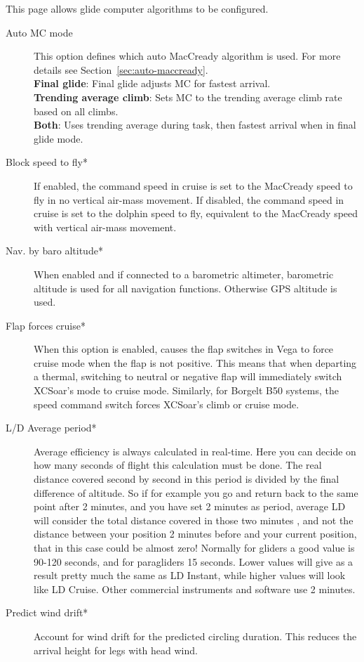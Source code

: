 This page allows glide computer algorithms to be configured.

\begin{description}
\item[Auto MC mode]  This option defines which auto MacCready algorithm is used.
  For more details see Section~\ref{sec:auto-maccready}. \\
  {\bf Final glide}: Final glide adjusts MC for fastest arrival. \\
  {\bf Trending average climb}: Sets MC to the trending average climb rate based 
  on all climbs. \\
  {\bf Both}: Uses trending average during task, then fastest arrival when in final 
  glide mode.
\item[Block speed to fly*]  If enabled, the command speed in cruise
  is set to the MacCready speed to fly in no vertical air-mass movement.
  If disabled, the command speed in cruise is set to the dolphin speed to fly,
  equivalent to the MacCready speed with vertical air-mass movement.
\item[Nav. by baro altitude*]  When enabled and if connected to a barometric
  altimeter, barometric altitude is used for all navigation functions. Otherwise
  GPS altitude is used.
\item[Flap forces cruise*]
  When this option is enabled, causes the flap switches in Vega to
  force cruise mode when the flap is not positive. This means that
  when departing a thermal, switching to neutral or negative flap will
  immediately switch XCSoar's mode to cruise mode.
  Similarly, for Borgelt B50 systems, the speed command switch forces
  XCSoar's climb or cruise mode.
\item[L/D Average period*]  Average efficiency is always calculated in real-time. 
  Here you can decide on how many seconds of flight this calculation must be done. 
  The real distance covered second by second in this period is divided by the final 
  difference of altitude.  So if for example you go and return back to the same point 
  after 2 minutes, and you have set 2 minutes as period, average LD will consider the 
  total distance covered in those two minutes , and not the distance between your 
  position 2 minutes before and your current position, that in this case could be 
  almost zero! Normally for gliders a good value is 90-120 seconds, and for paragliders 
  15 seconds. Lower values will give as a result pretty much the same as LD Instant, 
  while higher values will look like LD Cruise. Other commercial instruments and 
  software use 2 minutes.
\item[Predict wind drift*]  Account for wind drift for the predicted circling 
  duration. This reduces the arrival height for legs with head wind.
\end{description}


